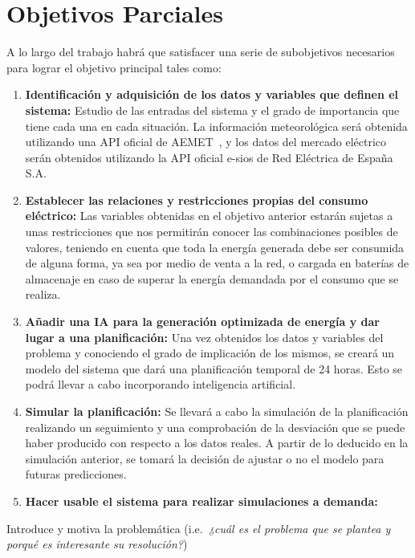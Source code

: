 \section{Objetivos Parciales}
A lo largo del trabajo habrá que satisfacer una serie de subobjetivos necesarios para lograr el objetivo principal tales como:
\begin{enumerate}
	\item \textbf{Identificación y adquisición de los datos y variables que definen el sistema:}
	Estudio de las entradas del sistema y el grado de importancia que tiene cada una en cada situación. La información meteorológica será obtenida utilizando una API oficial de AEMET~\cite{Aemet}, y los datos del mercado eléctrico serán obtenidos utilizando la API oficial e-sios de Red Eléctrica de España S.A.~\cite{Esios}

	\item \textbf{Establecer las relaciones y restricciones propias del consumo eléctrico:}
	Las variables obtenidas en el objetivo anterior estarán sujetas a unas restricciones que nos permitirán conocer las combinaciones posibles de valores, teniendo en cuenta que toda la energía generada debe ser consumida de alguna forma, ya sea por medio de venta a la red, o cargada en baterías de almacenaje en caso de superar la energía demandada por el consumo que se realiza.

	\item \textbf{Añadir una IA para la generación optimizada de energía y dar lugar a una planificación:}
	Una vez obtenidos los datos y variables del problema y conociendo el grado de implicación de los mismos, se creará un modelo del sistema que dará una planificación temporal de 24 horas. Esto se podrá llevar a cabo incorporando inteligencia artificial.

	\item \textbf{Simular la planificación:}
	  Se llevará a cabo la simulación de la planificación realizando un seguimiento y una comprobación de la desviación que se puede haber producido con respecto a los datos reales. A partir de lo deducido en la simulación anterior, se tomará la decisión de ajustar o no el modelo para futuras predicciones.

        \item \textbf{Hacer usable el sistema para realizar simulaciones a demanda:}

\end{enumerate}

Introduce y motiva la problemática (i.e.\emph{\ ¿cuál es el problema que se plantea y porqué es interesante su resolución?})

